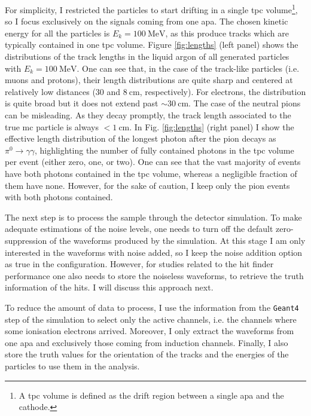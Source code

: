 For simplicity, I restricted the particles to start drifting in a single \gls{tpc} volume\footnote{A \gls{tpc} volume is defined as the drift region between a single \gls{apa} and the cathode.}, so I focus exclusively on the signals coming from one \gls{apa}. The chosen kinetic energy for all the particles is $E_{k} = 100 \ \mathrm{MeV}$, as this produce tracks which are typically contained in one \gls{tpc} volume. Figure \ref{fig:lengths} (left panel) shows the distributions of the track lengths in the liquid argon of all generated particles with $E_{k} = 100 \ \mathrm{MeV}$. One can see that, in the case of the track-like particles (i.e. muons and protons), their length distributions are quite sharp and centered at relatively low distances ($30$ and $8 \ \mathrm{cm}$, respectively). For electrons, the distribution is quite broad but it does not extend past $\sim 30 \ \mathrm{cm}$. The case of the neutral pions can be misleading. As they decay promptly, the track length associated to the true \gls{mc} particle is always $< 1 \ \mathrm{cm}$. In Fig. \ref{fig:lengths} (right panel) I show the effective length distribution of the longest photon after the pion decays as $\pi^{0} \rightarrow \gamma \gamma$, highlighting the number of fully contained photons in the \gls{tpc} volume per event (either zero, one, or two). One can see that the vast majority of events have both photons contained in the \gls{tpc} volume, whereas a negligible fraction of them have none. However, for the sake of caution, I keep only the pion events with both photons contained.

The next step is to process the sample through the detector simulation. To make adequate estimations of the noise levels, one needs to turn off the default zero-suppression of the waveforms produced by the simulation. At this stage I am only interested in the waveforms with noise added, so I keep the noise addition option as true in the configuration. However, for studies related to the hit finder performance one also needs to store the noiseless waveforms, to retrieve the truth information of the hits. I will discuss this approach next.

To reduce the amount of data to process, I use the information from the \texttt{Geant4} step of the simulation to select only the active channels, i.e. the channels where some ionisation electrons arrived. Moreover, I only extract the waveforms from one \gls{apa} and exclusively those coming from induction channels. Finally, I also store the truth values for the orientation of the tracks and the energies of the particles to use them in the analysis.

